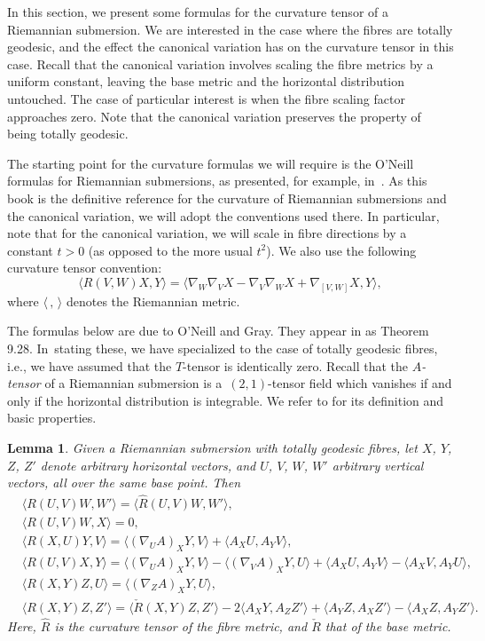 \documentclass[11pt]{article}
\numberwithin{equation}{section}
\numberwithin{equation}{section}
\newtheorem{Lemma}[Theorem]{Lemma}
\begin{document}
In this section, we present some formulas for the curvature tensor of a Riemannian submersion. We are interested in the case where the fibres are totally geodesic, and the effect the canonical variation has on the curvature tensor in this case. Recall that the canonical variation involves scaling the fibre metrics by a uniform constant, leaving the base metric and the horizontal distribution untouched. The case of particular interest is when the fibre scaling factor approaches zero. Note that the canonical variation preserves the property of being totally geodesic.

The starting point for the curvature formulas we will require is the O'Neill formulas for Riemannian submersions, as presented, for example, in~\cite{Be}. As this book is the definitive reference for the curvature of Riemannian submersions and the canonical variation, we will adopt the conventions used there. In particular, note that for the canonical variation, we will scale in fibre directions by a constant $t>0$ \big(as opposed to the more usual $t^2$\big). We also use the following curvature tensor convention:
\[
\langle R(V,W)X,Y\rangle=\bigl\langle \nabla_W\nabla_V X -\nabla_V \nabla_W X+\nabla_{[V,W]}X,Y\bigr\rangle,
\]
where $\langle\,,\,\rangle$ denotes the Riemannian metric.

The formulas below are due to O'Neill and Gray. They appear in \cite{Be} as Theorem 9.28. In~stating these, we have specialized to the case of totally geodesic fibres, i.e., we have assumed that the $T$-tensor is identically zero. Recall that the \emph{$A$-tensor} of a Riemannian submersion is a~$(2,1)$-tensor field which vanishes if and only if the horizontal distribution is integrable. We refer to \cite[Section 9.C]{Be} for its definition and basic properties.

\begin{Lemma}\label{formulas1}
	Given a Riemannian submersion with totally geodesic fibres, let $X$, $Y$, $Z$, $Z'$ denote arbitrary horizontal vectors, and $U$, $V$, $W$, $W'$ arbitrary vertical vectors, all over the same base point. Then
	\begin{align*}
		&\bigl\langle R(U,V)W,W' \bigr\rangle =\bigl\langle \hat{R}(U,V)W,W' \bigr\rangle, \\
		&\langle R(U,V)W,X \rangle =0, \\
		&\langle R(X,U)Y,V \rangle =\langle (\nabla_U A)_X Y,V \rangle+\langle A_X U, A_Y V\rangle, \\
		&\langle R(U,V)X,Y \rangle =\langle (\nabla_U A)_X Y,V \rangle-\langle (\nabla_V A)_X Y,U\rangle+\langle A_XU,A_YV \rangle-\langle A_XV, A_YU \rangle, \\
		&\langle R(X,Y)Z,U \rangle = \langle (\nabla_ZA)_X Y,U \rangle, \\
		&\bigl\langle R(X,Y)Z,Z' \bigr\rangle =\bigl\langle \check{R}(X,Y)Z,Z' \bigr\rangle-2\bigl\langle A_XY,A_ZZ' \bigr\rangle + \bigl\langle A_Y Z,A_X Z'\bigr\rangle-\bigl\langle A_X Z, A_Y Z'\bigr\rangle.
	\end{align*}
	Here, $\hat{R}$ is the curvature tensor of the fibre metric, and $\check{R}$ that of the base metric.
\end{Lemma}
\end{document}
